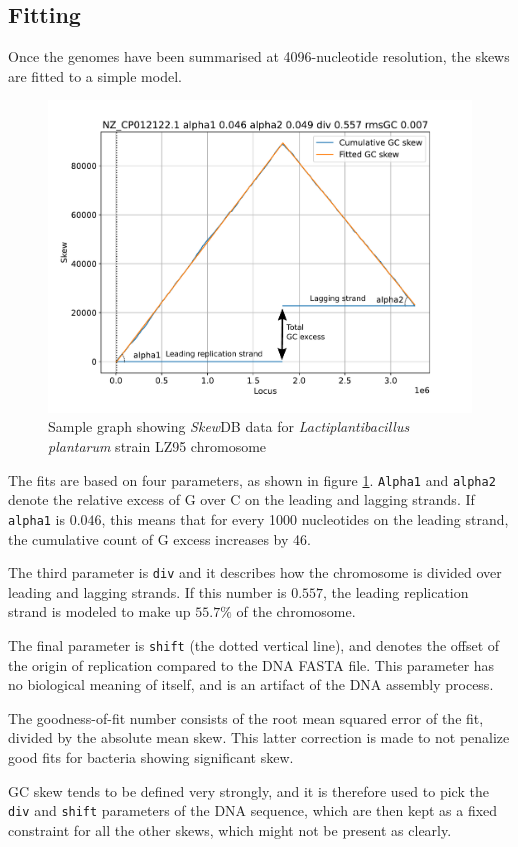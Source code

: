 \documentclass[fleqn,10pt]{wlscirep}
\begin{document}
\subsection*{Fitting}
Once the genomes have been summarised at 4096-nucleotide resolution, the skews are fitted to a simple model.

\begin{figure}[ht]
\centering
\includegraphics[width=0.7\linewidth]{explainer.pdf}
\caption{Sample graph showing \emph{Skew}DB data for \emph{Lactiplantibacillus plantarum} strain LZ95 chromosome}
\label{fig:explainer-graph}
\end{figure}

The fits are based on four parameters, as shown in figure \ref{fig:explainer-graph}. {\tt Alpha1} and {\tt alpha2} denote the relative excess of G over C on the leading and lagging strands. If {\tt alpha1} is $0.046$, this means that for every 1000 nucleotides on the leading strand, the cumulative count of G excess increases by 46.

The third parameter is {\tt div} and it describes how the chromosome is divided over leading and lagging strands. If this number is $0.557$, the leading replication strand is modeled to make up $55.7\%$ of the chromosome.

The final parameter is {\tt shift} (the dotted vertical line), and denotes the offset of the origin of replication compared to the DNA FASTA file. This parameter has no biological meaning of  itself, and is an artifact of the DNA assembly process. 

The goodness-of-fit number consists of the root mean squared error of the fit, divided by the absolute mean skew. This latter correction is made to not penalize good fits for bacteria showing significant skew.

GC skew tends to be defined very strongly, and it is therefore used to pick the {\tt div} and {\tt shift} parameters of the DNA sequence, which are then kept as a fixed constraint for all the other skews, which might not be present as clearly.
\end{document}

